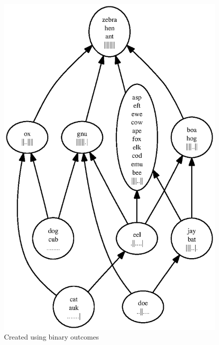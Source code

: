 \documentclass[11pt,twoside]{article}
\theoremstyle{definition}
\begin{document}
\begin{figure}
\centering
\includegraphics[scale=0.75]{rank1.ps}
\caption{Created using binary outcomes}

\end{figure}
\end{document}
